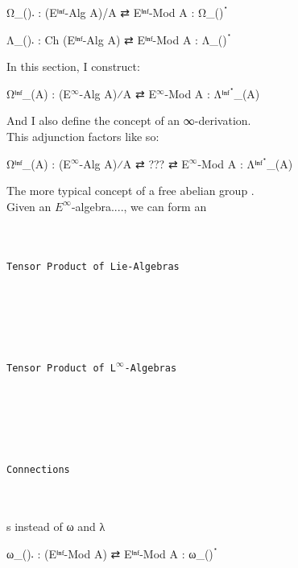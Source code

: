 \documentclass{book}
\theoremstyle{definition}
\renewcommand{\chapter}[1]{
\newpage
{
\Huge 
\begin{center}
\ \\
\ \\
\thispagestyle{empty}
\texttt{#1}
\end{center}}
\ \\
\ \\
}
\begin{document}
\begin{center}
Ω\_()𛲔 : (Eⁱⁿᶠ-Alg A)/A ⇄ Eⁱⁿᶠ-Mod A : Ω\_()ॱ
\end{center}

\begin{center}
Λ\_()𛲔 : Ch (Eⁱⁿᶠ-Alg A) ⇄ Eⁱⁿᶠ-Mod A : Λ\_()ॱ
\end{center}



In this section, I construct: 

\begin{center}
Ωⁱⁿᶠ\_(A) : (E${}^{\infty}$-Alg A)⁄A ⇄ E${}^{\infty}$-Mod A : Λⁱⁿᶠॱ\_(A)
\end{center}

And I also define the concept of an ∞-derivation.\\

This adjunction factors like so:

\begin{center}
Ωⁱⁿᶠ\_(A) : (E${}^{\infty}$-Alg A)⁄A ⇄ ??? ⇄ E${}^{\infty}$-Mod A : Λⁱⁿᶠॱ\_(A)
\end{center}


The more typical concept of a free abelian group .\\


Given an $E^{\infty}$-algebra...., we can form an \\

\newpage
\chapter{Tensor Product of Lie-Algebras}




\newpage
\chapter{Tensor Product of L${}^{\infty}$-Algebras}




\newpage
\chapter{Connections}

s instead of ω and λ

\iffalse
\begin{center}
ω\_()𛲔 : (Eⁱⁿᶠ-Mod A) ⇄ Eⁱⁿᶠ-Mod A : ω\_()ॱ
\end{center}
\end{document}
